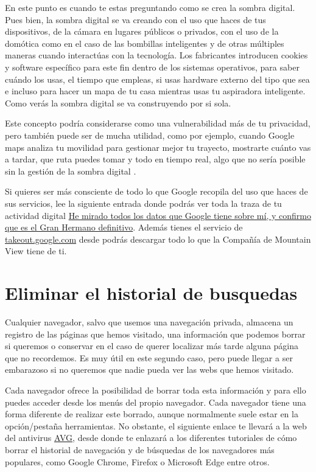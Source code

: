\documentclass[
  a4paper,
  openany]{book}
\begin{document}
En este punto es cuando te estas preguntando como se crea la sombra digital. Pues bien, la sombra digital se va creando con el uso que haces de tus dispositivos, de la cámara en lugares públicos o privados, con el uso de la domótica como en el caso de las bombillas inteligentes y de otras múltiples maneras cuando interactúas con la tecnología. Los fabricantes introducen cookies y software específico para este fin dentro de los sistemas operativos, para saber cuándo los usas, el tiempo que empleas, si usas hardware externo del tipo que sea e incluso para hacer un mapa de tu casa mientras usas tu aspiradora inteligente. Como verás la sombra digital se va construyendo por si sola.

Este concepto podría considerarse como una vulnerabilidad más de tu privacidad, pero también puede ser de mucha utilidad, como por ejemplo, cuando Google maps analiza tu movilidad para gestionar mejor tu trayecto, mostrarte cuánto vas a tardar, que ruta puedes tomar y todo en tiempo real, algo que no sería posible sin la gestión de la sombra digital \citep{XATAKA-sombra-digital}.

Si quieres ser más consciente de todo lo que Google recopila del uso que haces de sus servicios, lee la siguiente entrada donde podrás ver toda la traza de tu actividad digital \href{https://www.xataka.com/privacidad/he-mirado-todos-datos-que-google-tiene-mi-confirmo-que-gran-hermano-definitivo-2}{He mirado todos los datos que Google tiene sobre mí, y confirmo que es el Gran Hermano definitivo}. Además tienes el servicio de \href{https://takeout.google.com}{takeout.google.com} desde podrás descargar todo lo que la Compañía de Mountain View tiene de ti.

\hypertarget{eliminar-el-historial-de-busquedas}{%
\section{Eliminar el historial de busquedas}\label{eliminar-el-historial-de-busquedas}}

Cualquier navegador, salvo que usemos una navegación privada, almacena un registro de las páginas que hemos visitado, una información que podemos borrar si queremos o conservar en el caso de querer localizar más tarde alguna página que no recordemos. Es muy útil en este segundo caso, pero puede llegar a ser embarazoso si no queremos que nadie pueda ver las webs que hemos visitado.

Cada navegador ofrece la posibilidad de borrar toda esta información y para ello puedes acceder desde los menús del propio navegador. Cada navegador tiene una forma diferente de realizar este borrado, aunque normalmente suele estar en la opción/pestaña herramientas. No obstante, el siguiente enlace te llevará a la web del antivirus \href{https://www.avg.com/es/signal/how-to-clear-your-browsing-and-search-history}{AVG}, desde donde te enlazará a los diferentes tutoriales de cómo borrar el historial de navegación y de búsquedas de los navegadores más populares, como Google Chrome, Firefox o Microsoft Edge entre otros.
\end{document}
